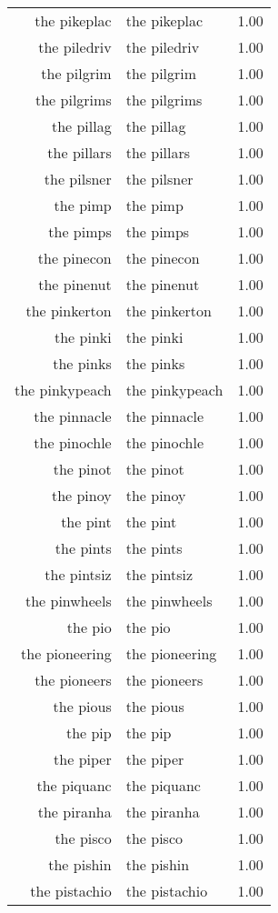 \begin{table}[ht]
\begin{tabular}{rlr}
  the pikeplac & the pikeplac & 1.00 \\ 
  the piledriv & the piledriv & 1.00 \\ 
  the pilgrim & the pilgrim & 1.00 \\ 
  the pilgrims & the pilgrims & 1.00 \\ 
  the pillag & the pillag & 1.00 \\ 
  the pillars & the pillars & 1.00 \\ 
  the pilsner & the pilsner & 1.00 \\ 
  the pimp & the pimp & 1.00 \\ 
  the pimps & the pimps & 1.00 \\ 
  the pinecon & the pinecon & 1.00 \\ 
  the pinenut & the pinenut & 1.00 \\ 
  the pinkerton & the pinkerton & 1.00 \\ 
  the pinki & the pinki & 1.00 \\ 
  the pinks & the pinks & 1.00 \\ 
  the pinkypeach & the pinkypeach & 1.00 \\ 
  the pinnacle & the pinnacle & 1.00 \\ 
  the pinochle & the pinochle & 1.00 \\ 
  the pinot & the pinot & 1.00 \\ 
  the pinoy & the pinoy & 1.00 \\ 
  the pint & the pint & 1.00 \\ 
  the pints & the pints & 1.00 \\ 
  the pintsiz & the pintsiz & 1.00 \\ 
  the pinwheels & the pinwheels & 1.00 \\ 
  the pio & the pio & 1.00 \\ 
  the pioneering & the pioneering & 1.00 \\ 
  the pioneers & the pioneers & 1.00 \\ 
  the pious & the pious & 1.00 \\ 
  the pip & the pip & 1.00 \\ 
  the piper & the piper & 1.00 \\ 
  the piquanc & the piquanc & 1.00 \\ 
  the piranha & the piranha & 1.00 \\ 
  the pisco & the pisco & 1.00 \\ 
  the pishin & the pishin & 1.00 \\ 
  the pistachio & the pistachio & 1.00 \\ 

\end{tabular}
\end{table}
